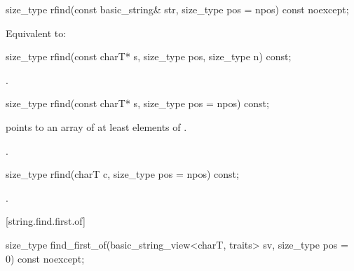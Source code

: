 %
\begin{itemdecl}
size_type rfind(const basic_string& str, size_type pos = npos) const noexcept;
\end{itemdecl}

\begin{itemdescr}
\pnum
\effects
Equivalent to: 
\end{itemdescr}

%
\begin{itemdecl}
size_type rfind(const charT* s, size_type pos, size_type n) const;
\end{itemdecl}

\begin{itemdescr}
\pnum
\returns
{}.
\end{itemdescr}

%
\begin{itemdecl}
size_type rfind(const charT* s, size_type pos = npos) const;
\end{itemdecl}

\begin{itemdescr}
\pnum
\requires {} points to an array of at least 
elements of .

\pnum
\returns
{}.
\end{itemdescr}

%
\begin{itemdecl}
size_type rfind(charT c, size_type pos = npos) const;
\end{itemdecl}

\begin{itemdescr}
\pnum
\returns
{}.
\end{itemdescr}

[string.find.first.of]{}

%
\begin{itemdecl}
size_type find_first_of(basic_string_view<charT, traits> sv, size_type pos = 0) const noexcept;
\end{itemdecl}

